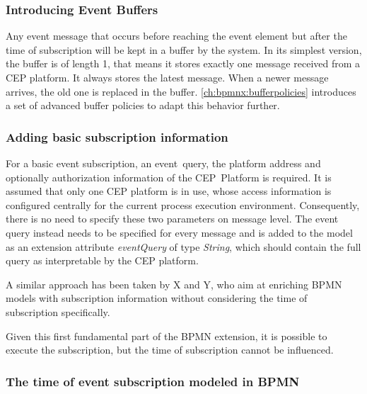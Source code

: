 \subsubsection{Introducing Event Buffers}
Any event message that occurs before reaching the event element but after the time of subscription will be kept in a buffer by the system.
In its simplest version, the buffer is of length 1, that means it stores exactly one message received from a CEP platform. It always stores the latest message. When a newer message arrives, the old one is replaced in the buffer.
\autoref{ch:bpmnx:bufferpolicies} introduces a set of advanced buffer policies to adapt this behavior further.

\subsubsection{Adding basic subscription information}\label{ch:bpmnx:basic}

For a basic event subscription, an event~query, the platform address and optionally authorization information of the CEP~Platform is required. 
It is assumed that only one CEP platform is in use, whose access information is configured centrally for the current process execution environment. Consequently, there is no need to specify these two parameters on message level. 
The event query instead needs to be specified for every message and is added to the model as an extension attribute \textit{eventQuery} of type \textit{String}, which should contain the full query as interpretable by the CEP platform.

A similar approach has been taken by X and Y, who aim at enriching BPMN models with subscription information without considering the time of subscription specifically.

Given this first fundamental part of the BPMN extension, it is possible to execute the subscription, but the time of subscription cannot be influenced.

\subsubsection{The time of event subscription modeled in BPMN}\label{ch:bpmnx:subscriptiontimes}

